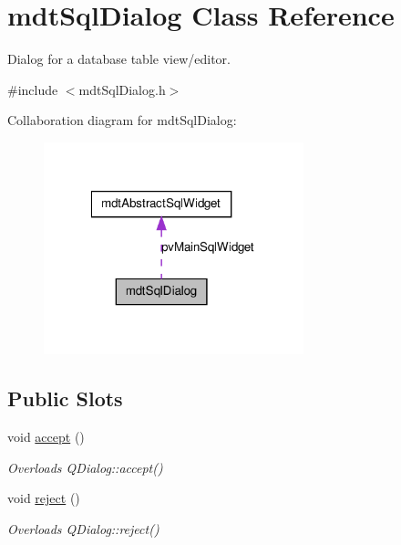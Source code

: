 \hypertarget{classmdt_sql_dialog}{
\section{mdtSqlDialog Class Reference}
\label{classmdt_sql_dialog}
}


Dialog for a database table view/editor.  




{\ttfamily \#include $<$mdtSqlDialog.h$>$}



Collaboration diagram for mdtSqlDialog:
\nopagebreak
\begin{figure}[H]
\begin{center}
\leavevmode
\includegraphics[width=214pt]{classmdt_sql_dialog__coll__graph}
\end{center}
\end{figure}
\subsection*{Public Slots}
\begin{DoxyCompactItemize}
\item 
\hypertarget{classmdt_sql_dialog_affba1732b5f32db150d0e700ecc339f8}{
void \hyperlink{classmdt_sql_dialog_affba1732b5f32db150d0e700ecc339f8}{accept} ()}
\label{classmdt_sql_dialog_affba1732b5f32db150d0e700ecc339f8}

\begin{DoxyCompactList}\small\item\em Overloads QDialog::accept() \end{DoxyCompactList}\item 
\hypertarget{classmdt_sql_dialog_ada1726d5861cb071fab7a1c31bc52abb}{
void \hyperlink{classmdt_sql_dialog_ada1726d5861cb071fab7a1c31bc52abb}{reject} ()}
\label{classmdt_sql_dialog_ada1726d5861cb071fab7a1c31bc52abb}

\begin{DoxyCompactList}\small\item\em Overloads QDialog::reject() \end{DoxyCompactList}\end{DoxyCompactItemize}
